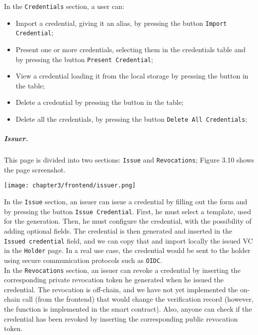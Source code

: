 \vspace*{0.3cm}
In the \texttt{Credentials} section, a user can:
\begin{itemize}
    \item Import a credential, giving it an alias, by pressing the button \texttt{Import Credential};
    \item Present one or more credentials, selecting them in the credentials table
    and by pressing the button \texttt{Present Credential};
    \item View a credential loading it from the local storage by pressing the button in the table;
    \item Delete a credential by pressing the button in the table;
    \item Delete all the credentials, by pressing the button \texttt{Delete All Credentials};
\end{itemize}

\clearpage
\subparagraph{Issuer.} This page is divided into two sections: \texttt{Issue}
and \texttt{Revocations}; Figure 3.10 shows the page screenshot.
\begin{center}
    \begin{tcolorbox}[
        beamer,
        width=0.6\textheight,
        arc=0pt,
        boxsep=0pt,
        left=0pt,right=0pt,top=0pt,bottom=0pt,
        ]
    \texttt{[image: chapter3/frontend/issuer.png]}
    \end{tcolorbox}
\end{center}
In the \texttt{Issue} section, an issuer can issue a credential by filling out the form and
by pressing the button \texttt{Issue Credential}. First, he must select a template,
used for the generation. Then, he must configure the credential, with the possibility
of adding optional fields. The credential is then generated
and inserted in the \texttt{Issued credential} field, and we can copy that and import
locally the issued VC in the \texttt{Holder} page. In a real use case, the credential
would be sent to the holder using secure communication protocols such as \texttt{OIDC}.
\vspace*{0.3cm}\\
In the \texttt{Revocations} section, an issuer can revoke a credential by inserting
the corresponding private revocation token he generated when he issued the credential.
The revocation is off-chain, and we have not yet implemented the on-chain call (from the
frontend) that would change the verification record (however, the function is
implemented in the smart contract). Also, anyone can check if the credential has been
revoked by inserting the corresponding public revocation token.

